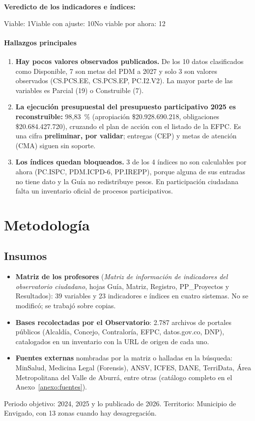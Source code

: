 \documentclass[11pt,letterpaper]{article}
\begin{document}
\noindent\textbf{Veredicto de los indicadores e índices:}\par\smallskip\centerline{\colorbox{cverde}{Viable: 1}\quad \colorbox{camarillo}{Viable con ajuste: 10}\quad \colorbox{crojo}{No viable por ahora: 12}}

\paragraph{Hallazgos principales}

\begin{enumerate}

\item \textbf{Hay pocos valores observados publicados.} De los 10 datos clasificados como Disponible, 7 son metas del PDM a 2027 y solo 3 son valores observados (CS.PCS.EE, CS.PCS.EP, PC.I2.V2). La mayor parte de las variables es Parcial (19) o Construible (7).

\item \textbf{La ejecución presupuestal del presupuesto participativo 2025 es reconstruible:} 98,83~\% (apropiación \$20.928.690.218, obligaciones \$20.684.427.720), cruzando el plan de acción con el listado de la EFPC. Es una cifra \textbf{preliminar, por validar}; entregas (CEP) y metas de atención (CMA) siguen sin soporte.

\item \textbf{Los índices quedan bloqueados.} 3 de los 4 índices no son calculables por ahora (PC.ISPC, PDM.ICPD-6, PP.IREPP), porque alguna de sus entradas no tiene dato y la Guía no redistribuye pesos. En participación ciudadana falta un inventario oficial de procesos participativos.

\end{enumerate}

\section{Metodología}
\subsection{Insumos}
\begin{itemize}
\item \textbf{Matriz de los profesores} (\emph{Matriz de información de indicadores del observatorio ciudadano}, hojas Guía, Matriz, Registro, PP\_Proyectos y Resultados): 39 variables y 23 indicadores e índices en cuatro sistemas. No se modificó; se trabajó sobre copias.
\item \textbf{Bases recolectadas por el Observatorio}: 2.787 archivos de portales públicos (Alcaldía, Concejo, Contraloría, EFPC, datos.gov.co, DNP), catalogados en un inventario con la URL de origen de cada uno.
\item \textbf{Fuentes externas} nombradas por la matriz o halladas en la búsqueda: MinSalud, Medicina Legal (Forensis), ANSV, ICFES, DANE, TerriData, Área Metropolitana del Valle de Aburrá, entre otras (catálogo completo en el Anexo~\ref{anexo:fuentes}).
\end{itemize}
Periodo objetivo: 2024, 2025 y lo publicado de 2026. Territorio: Municipio de Envigado, con 13 zonas cuando hay desagregación.
\end{document}
